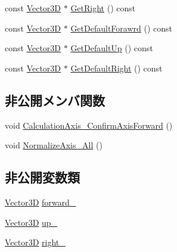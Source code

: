 \begin{DoxyCompactItemize}
\item 
const \mbox{\hyperlink{class_vector3_d}{Vector3D}} $\ast$ \mbox{\hyperlink{class_axis_vector_a1d4f944d118d6f999c516dbdc0827a39}{Get\+Right}} () const
\item 
const \mbox{\hyperlink{class_vector3_d}{Vector3D}} $\ast$ \mbox{\hyperlink{class_axis_vector_a83ead17514eb08954dc74c0e72b6158c}{Get\+Default\+Forawrd}} () const
\item 
const \mbox{\hyperlink{class_vector3_d}{Vector3D}} $\ast$ \mbox{\hyperlink{class_axis_vector_a32f68ef0864e7b589d3c1996a61e11fc}{Get\+Default\+Up}} () const
\item 
const \mbox{\hyperlink{class_vector3_d}{Vector3D}} $\ast$ \mbox{\hyperlink{class_axis_vector_aacf0879e0b9ace6cfbd29c8a300cd960}{Get\+Default\+Right}} () const
\end{DoxyCompactItemize}
\subsection*{非公開メンバ関数}
\begin{DoxyCompactItemize}
\item 
void \mbox{\hyperlink{class_axis_vector_a1b7758fdc7a7ef1809a7a5de1777ee65}{Calculation\+Axis\+\_\+\+Confirm\+Axis\+Forward}} ()
\item 
void \mbox{\hyperlink{class_axis_vector_abd3b0ec608bc18dc9996cf9fa1d121b0}{Normalize\+Axis\+\_\+\+All}} ()
\end{DoxyCompactItemize}
\subsection*{非公開変数類}
\begin{DoxyCompactItemize}
\item 
\mbox{\hyperlink{class_vector3_d}{Vector3D}} \mbox{\hyperlink{class_axis_vector_aec3d9026c069398bc320bc978c060b67}{forward\+\_\+}}
\item 
\mbox{\hyperlink{class_vector3_d}{Vector3D}} \mbox{\hyperlink{class_axis_vector_ab73c08b8dbf399af48b01b4a17bd5d33}{up\+\_\+}}
\item 
\mbox{\hyperlink{class_vector3_d}{Vector3D}} \mbox{\hyperlink{class_axis_vector_af3e806442baa272fe79a08a38c8a6669}{right\+\_\+}}
\end{DoxyCompactItemize}

